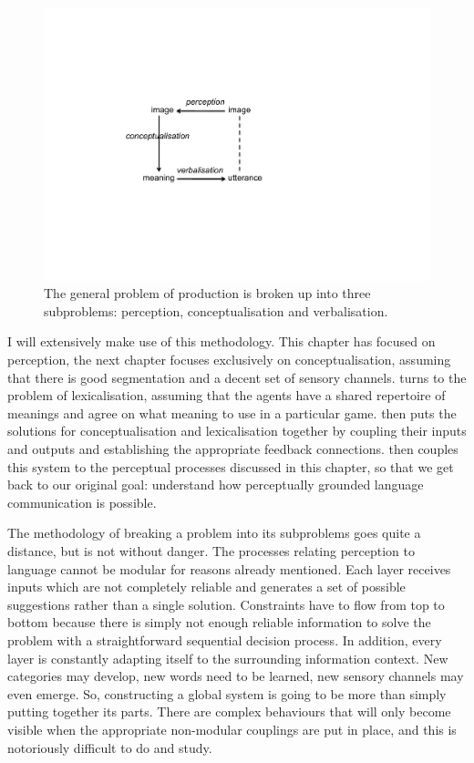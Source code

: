 \begin{figure}[htbp]
  \centerline{\includegraphics[width=.50\textwidth]{chap3/figs/square.pdf}}
\caption{\label{square}The general problem of 
production is broken up into three subproblems: perception, 
conceptualisation and verbalisation.}
\end{figure}

I will extensively make use of this methodology. 
This chapter has focused on perception, the next chapter focuses
exclusively on
conceptualisation, assuming that there is good segmentation and a 
decent set of sensory channels.  turns to the 
problem of lexicalisation, assuming that 
the agents have a shared repertoire of meanings and agree on 
what meaning to use in a particular game.  then puts the solutions 
for conceptualisation and lexicalisation together by coupling their
inputs and outputs and establishing the appropriate feedback connections. 
 then couples this system to the perceptual processes discussed
in this chapter, so that we get back to our 
original goal: understand how perceptually grounded language communication 
is possible. 

The methodology of breaking a problem into its subproblems goes quite 
a distance, but is not without danger. The processes relating
perception to language cannot be modular for reasons already mentioned. 
Each layer receives inputs which are not completely reliable and 
generates a set of possible suggestions rather than a single
 solution. Constraints have to flow
from top to bottom because there is simply not enough reliable 
information to solve the problem with a straightforward sequential 
decision process. In addition, every layer is constantly adapting 
itself to the surrounding information context. New categories 
may develop, new words need to be learned, new sensory 
channels may even emerge. So, constructing a global system is going 
to be more than simply putting together its parts. There are complex
behaviours that will only become visible when the appropriate non-modular
couplings are put in place, and this is notoriously difficult to 
do and study. 

